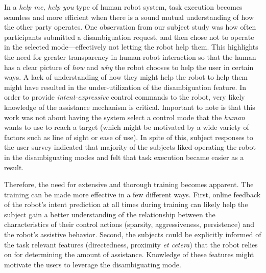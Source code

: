 \documentclass[natbib, twocolumn]{svjour3}          %
\begin{document}
 

 In a \textit{help me, help you} type of human robot system, task execution becomes seamless and more efficient when there is a sound mutual understanding of how the other party operates. One observation from our subject study was how often participants submitted a disambiguation request, and then chose not to operate in the selected mode---effectively not letting the robot help them. This highlights the need for greater transparency in human-robot interaction so that the human has a clear picture of \textit{how} and \textit{why} the robot chooses to help the user in certain ways. A lack of understanding of how they might help the robot to help them might have resulted in the under-utilization of the disambiguation feature. In order to provide \textit{intent-expressive} control commands to the robot, very likely knowledge of the assistance mechanism is critical.  Important to note is that this work was not about having the system select a control mode that the \textit{human} wants to use to reach a target (which might be motivated by a wide variety of factors such as line of sight or ease of use). In spite of this, subject responses to the user survey indicated that majority of the subjects liked operating the robot in the disambiguating modes and felt that task execution became easier as a result. 
 
 Therefore, the need for extensive and thorough training becomes apparent.
 The training can be made more effective in a few different ways. First, online feedback of the robot's intent prediction at all times during training can likely help the subject gain a better understanding of the relationship between the characteristics of their control actions (sparsity, aggressiveness, persistence) and the robot's assistive behavior. Second, the subjects could be explicitly informed of the task relevant features (directedness, proximity \textit{et cetera}) that the robot relies on for determining the amount of assistance. Knowledge of these features might motivate the users to leverage the disambiguating mode. 
 
\end{document}
